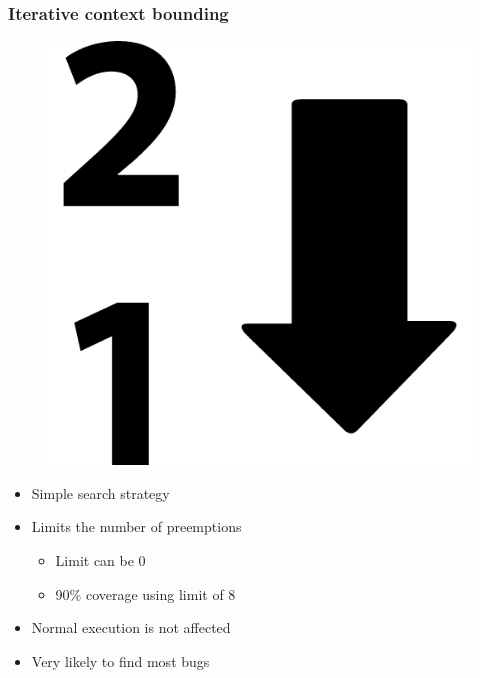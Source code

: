 \documentclass{beamer}
\begin{document}
	\begin{frame}
		\frametitle{Iterative context bounding \cite{Musuvathi}}
		
		\begin{figure}[htbp]
			\centering
			\includegraphics[scale=0.1]{limit}
		\end{figure}
		
		\begin{itemize}
			\item Simple search strategy
			\item Limits the number of preemptions
			\begin{itemize}
				\item Limit can be 0
				\item 90\% coverage using limit of 8
			\end{itemize}
			\item Normal execution is not affected
			\item Very likely to find most bugs
		\end{itemize}
	\end{frame}
	
	
\end{document}
